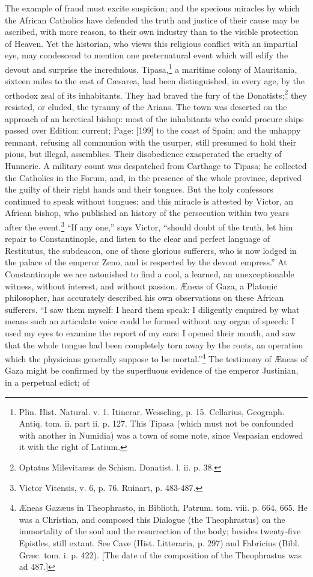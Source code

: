 The example of fraud must excite suspicion; and the specious miracles by which the African Catholics have defended the truth and justice of their cause may be ascribed, with more reason, to their own industry than to the visible protection of Heaven. Yet the historian, who views this religious conflict with an impartial eye, may condescend to mention one preternatural event which will edify the devout and surprise the incredulous. Tipasa,\footnote{Plin. Hist. Natural. v. 1. Itinerar. Wesseling, p. 15. Cellarius, Geograph. Antiq. tom. ii. part ii. p. 127. This Tipasa (which must not be confounded with another in Numidia) was a town of some note, since Vespasian endowed it with the right of Latium.} a maritime colony of Mauritania, sixteen miles to the east of Cæsarea, had been distinguished, in every age, by the orthodox zeal of its inhabitants. They had braved the fury of the Donatists;\footnote{Optatus Milevitanus de Schism. Donatist. l. ii. p. 38.} they resisted, or eluded, the tyranny of the Arians. The town was deserted on the approach of an heretical bishop: most of the inhabitants who could procure ships passed over Edition: current; Page: [199] to the coast of Spain; and the unhappy remnant, refusing all communion with the usurper, still presumed to hold their pious, but illegal, assemblies. Their disobedience exasperated the cruelty of Hunneric. A military count was despatched from Carthage to Tipasa; he collected the Catholics in the Forum, and, in the presence of the whole province, deprived the guilty of their right hands and their tongues. But the holy confessors continued to speak without tongues; and this miracle is attested by Victor, an African bishop, who published an history of the persecution within two years after the event.\footnote{Victor Vitensis, v. 6, p. 76. Ruinart, p. 483-487.} \texthebrew{“}If any one,\texthebrew{}” says Victor, \texthebrew{“}should doubt of the truth, let him repair to Constantinople, and listen to the clear and perfect language of Restitutus, the subdeacon, one of these glorious sufferers, who is now lodged in the palace of the emperor Zeno, and is respected by the devout empress.\texthebrew{}” At Constantinople we are astonished to find a cool, a learned, an unexceptionable witness, without interest, and without passion. Æneas of Gaza, a Platonic philosopher, has accurately described his own observations on these African sufferers. \texthebrew{“}I saw them myself: I heard them speak: I diligently enquired by what means such an articulate voice could be formed without any organ of speech: I used my eyes to examine the report of my ears: I opened their mouth, and saw that the whole tongue had been completely torn away by the roots, an operation which the physicians generally suppose to be mortal.\texthebrew{}”\footnote{Æneas Gazæus in Theophrasto, in Biblioth. Patrum. tom. viii. p. 664, 665. He was a Christian, and composed this Dialogue (the Theophrastus) on the immortality of the soul and the resurrection of the body; besides twenty-five Epistles, still extant. See Cave (Hist. Litteraria, p. 297) and Fabricius (Bibl. Græc. tom. i. p. 422). [The date of the composition of the Theophrastus was ad 487.]} The testimony of Æneas of Gaza might be confirmed by the superfluous evidence of the emperor Justinian, in a perpetual edict; of 